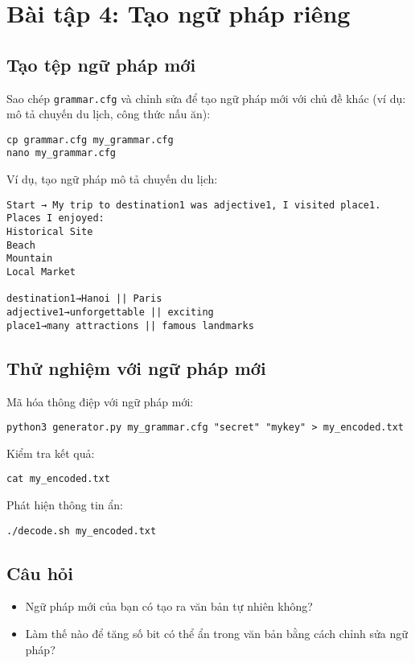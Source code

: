 \documentclass{article}
\begin{document}
\section{Bài tập 4: Tạo ngữ pháp riêng}
\subsection{Tạo tệp ngữ pháp mới}
Sao chép \texttt{grammar.cfg} và chỉnh sửa để tạo ngữ pháp mới với chủ đề khác (ví dụ: mô tả chuyến du lịch, công thức nấu ăn):

\begin{lstlisting}
cp grammar.cfg my_grammar.cfg
nano my_grammar.cfg
\end{lstlisting}

Ví dụ, tạo ngữ pháp mô tả chuyến du lịch:

\begin{lstlisting}
Start → My trip to destination1 was adjective1, I visited place1.
Places I enjoyed:
Historical Site
Beach
Mountain
Local Market

destination1→Hanoi || Paris
adjective1→unforgettable || exciting
place1→many attractions || famous landmarks
\end{lstlisting}

\subsection{Thử nghiệm với ngữ pháp mới}
Mã hóa thông điệp với ngữ pháp mới:

\begin{lstlisting}
python3 generator.py my_grammar.cfg "secret" "mykey" > my_encoded.txt
\end{lstlisting}

Kiểm tra kết quả:

\begin{lstlisting}
cat my_encoded.txt
\end{lstlisting}

Phát hiện thông tin ẩn:

\begin{lstlisting}
./decode.sh my_encoded.txt
\end{lstlisting}

\subsection{Câu hỏi}
\begin{itemize}
    \item Ngữ pháp mới của bạn có tạo ra văn bản tự nhiên không?
    \item Làm thế nào để tăng số bit có thể ẩn trong văn bản bằng cách chỉnh sửa ngữ pháp?
\end{itemize}
\end{document}
